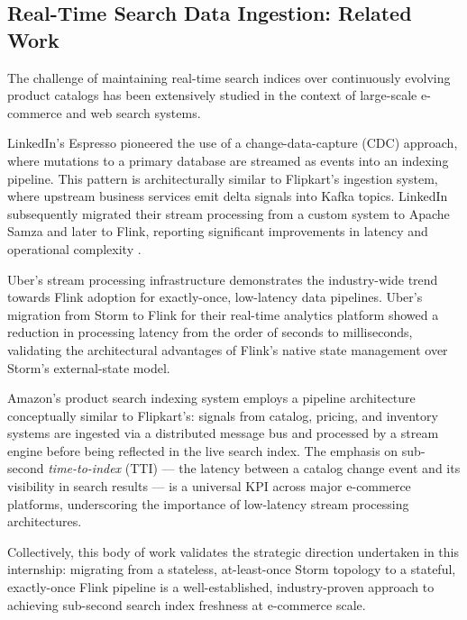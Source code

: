 \vspace{0.25cm}

\subsection{Real-Time Search Data Ingestion: Related Work}
\begin{justify}
    The challenge of maintaining real-time search indices over continuously evolving product catalogs has been extensively studied in the context of large-scale e-commerce and web search systems.

    LinkedIn's Espresso \cite{[14]} pioneered the use of a change-data-capture (CDC) approach, where mutations to a primary database are streamed as events into an indexing pipeline. This pattern is architecturally similar to Flipkart's ingestion system, where upstream business services emit delta signals into Kafka topics. LinkedIn subsequently migrated their stream processing from a custom system to Apache Samza and later to Flink, reporting significant improvements in latency and operational complexity \cite{[5]}.

    Uber's stream processing infrastructure \cite{[15]} demonstrates the industry-wide trend towards Flink adoption for exactly-once, low-latency data pipelines. Uber's migration from Storm to Flink for their real-time analytics platform showed a reduction in processing latency from the order of seconds to milliseconds, validating the architectural advantages of Flink's native state management over Storm's external-state model.

    Amazon's product search indexing system \cite{[1]} employs a pipeline architecture conceptually similar to Flipkart's: signals from catalog, pricing, and inventory systems are ingested via a distributed message bus and processed by a stream engine before being reflected in the live search index. The emphasis on sub-second \textit{time-to-index} (TTI) — the latency between a catalog change event and its visibility in search results — is a universal KPI across major e-commerce platforms, underscoring the importance of low-latency stream processing architectures.

    Collectively, this body of work validates the strategic direction undertaken in this internship: migrating from a stateless, at-least-once Storm topology to a stateful, exactly-once Flink pipeline is a well-established, industry-proven approach to achieving sub-second search index freshness at e-commerce scale.
\end{justify}
